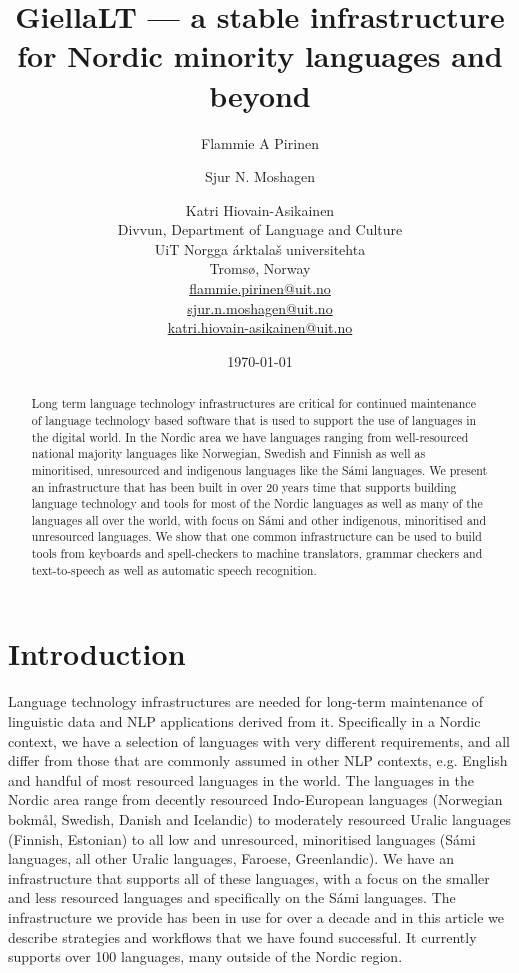 \documentclass[free]{flammie}
\title{GiellaLT --- a stable infrastructure for Nordic minority languages and
beyond}
\author{Flammie A Pirinen \and
  Sjur N. Moshagen \and
  Katri Hiovain-Asikainen\\
  Divvun, Department of Language and Culture \\
  UiT Norgga árktalaš universitehta \\
  Tromsø, Norway \\
  \url{flammie.pirinen@uit.no} \\
  \url{sjur.n.moshagen@uit.no} \\
  \url{katri.hiovain-asikainen@uit.no}
  }
\date{\today}
\begin{document}
\maketitle
\begin{abstract}
    Long term language technology infrastructures are critical for continued
    maintenance of language technology based software that is used to support
    the use of languages in the digital world.  In the Nordic area we have
    languages ranging from well-resourced national majority languages like
    Norwegian, Swedish and Finnish as well as minoritised, unresourced and
    indigenous languages like the Sámi languages.  We present an infrastructure
    that has been built in over 20 years time that supports building language
    technology and tools for most of the Nordic languages as well as many of the
    languages all over the world, with focus on Sámi and other indigenous,
    minoritised and unresourced languages.  We show that one common
    infrastructure can be used to build tools from keyboards and spell-checkers
    to machine translators, grammar checkers and text-to-speech as well as
    automatic speech recognition.
\end{abstract}



\section{Introduction}



Language technology infrastructures are needed for long-term maintenance of
linguistic data and NLP applications derived from it.  Specifically in a Nordic
context, we have a selection of languages with very different requirements, and
all differ from those that are commonly assumed in other NLP contexts, e.g.
English and handful of most resourced languages in the world.  The languages in
the Nordic area range from decently resourced Indo-European languages (Norwegian
bokmål, Swedish, Danish and Icelandic) to moderately resourced Uralic languages
(Finnish, Estonian) to all low and unresourced, minoritised languages (Sámi
languages, all other Uralic languages, Faroese, Greenlandic).  We have an
infrastructure that supports all of these languages, with a focus on the smaller
and less resourced languages and specifically on the Sámi languages.  The
infrastructure we provide has been in use for over a decade and in this article
we describe strategies and workflows that we have found successful.  It
currently supports over 100 languages, many outside of the Nordic region.
\end{document}

